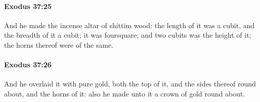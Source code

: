 		\paragraph{Exodus 37:25} %
			\label{EXODUS-37-25}

			And he made the incense altar of shittim wood: the length of it was a cubit, and the breadth of it a cubit; it was foursquare; and two cubits was the height of it; the horns thereof were of the same.


		\paragraph{Exodus 37:26} %
			\label{EXODUS-37-26}

			And he overlaid it with pure gold, both the top of it, and the sides thereof round about, and the horns of it: also he made unto it a crown of gold round about.


